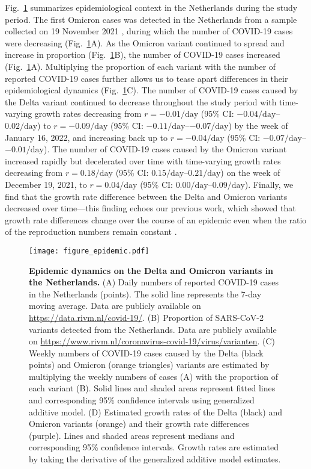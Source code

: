 \documentclass[12pt]{article}
\newcommand{\fref}[1]{Fig.~\ref{fig:#1}}
\begin{document}
\fref{epidemic} summarizes epidemiological context in the Netherlands during the study period.
The first Omicron cases was detected in the Netherlands from a sample collected on 19 November 2021 \citep{backer2021omicron}, during which the number of COVID-19 cases were decreasing (\fref{epidemic}A).
As the Omicron variant continued to spread and increase in proportion (\fref{epidemic}B), the number of COVID-19 cases  increased (\fref{epidemic}A).
Multiplying the proportion of each variant with the number of reported COVID-19 cases further allows us to tease apart differences in their epidemiological dynamics (\fref{epidemic}C).
The number of COVID-19 cases caused by the Delta variant continued to decrease throughout the study period with time-varying growth rates decreasing from $r = -0.01/\mathrm{day}$ (95\% CI: $-0.04/\mathrm{day}$--$0.02/\mathrm{day}$) to $r = -0.09/\mathrm{day}$ (95\% CI: $-0.11/\mathrm{day}$--$-0.07/\mathrm{day}$) by the week of January 16, 2022, and increasing back up to $r = -0.04/\mathrm{day}$ (95\% CI: $-0.07/\mathrm{day}$--$-0.01/\mathrm{day}$).
The number of COVID-19 cases caused by the Omicron variant increased rapidly but decelerated over time with time-varying growth rates decreasing from $r=0.18/\mathrm{day}$ (95\% CI: $0.15/\mathrm{day}$--$0.21/\mathrm{day}$) on the week of December 19, 2021, to $r=0.04/\mathrm{day}$ (95\% CI: $0.00/\mathrm{day}$--$0.09/\mathrm{day}$).
Finally, we find that the growth rate difference between the Delta and Omicron variants decreased over time---this finding echoes our previous work, which showed that growth rate differences change over the course of an epidemic even when the ratio of the reproduction numbers remain constant \citep{park2021roles}.

\begin{figure}[!ht]
\texttt{[image: figure\_epidemic.pdf]}
\caption{
\textbf{Epidemic dynamics on the Delta and Omicron variants in the Netherlands.}
(A) Daily numbers of reported COVID-19 cases in the Netherlands (points).
The solid line represents the 7-day moving average.
Data are publicly available on \url{https://data.rivm.nl/covid-19/}.
(B) Proportion of SARS-CoV-2 variants detected from the Netherlands. Data are publicly available on \url{https://www.rivm.nl/coronavirus-covid-19/virus/varianten}.
(C) Weekly numbers of COVID-19 cases caused by the Delta (black points) and Omicron (orange triangles) variants are estimated by multiplying the weekly numbers of cases (A) with the proportion of each variant (B).
Solid lines and shaded areas represent fitted lines and corresponding 95\% confidence intervals using generalized additive model.
(D) Estimated growth rates of the Delta (black) and Omicron variants (orange) and their growth rate differences (purple).
Lines and shaded areas represent medians and corresponding 95\% confidence intervals.
Growth rates are estimated by taking the derivative of the generalized additive model estimates.
\label{fig:epidemic}
}
\end{figure}
\end{document}
